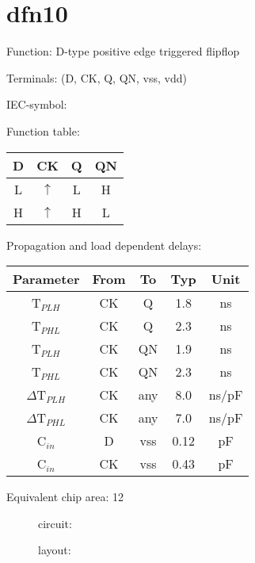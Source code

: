 \section{dfn10}

Function: D-type positive edge triggered flipflop

Terminals: (D, CK, Q, QN, vss, vdd)


IEC-symbol:
\begin{figure}[h]
\end{figure}

Function table:
\begin{table}[h]
\begin{tabular}{|c|c||c|c|}
\hline
D	&CK	&Q	&QN\\
\hline
L	&$\uparrow$	&L	&H\\
H	&$\uparrow$	&H	&L\\
\hline
\end{tabular}
\vspace{1cm}

Propagation and load dependent delays:\\

\begin{tabular}{|c|c|c|c|c|}
\hline
Parameter               &From            &To   &Typ    &Unit\\
\hline
T$_{PLH}$               &CK     	&Q      &1.8    &ns\\
T$_{PHL}$               &CK    		&Q      &2.3    &ns\\
T$_{PLH}$               &CK     	&QN     &1.9    &ns\\
T$_{PHL}$               &CK    		&QN     &2.3    &ns\\
\hline
$\Delta$T$_{PLH}$       &CK          	&any    &8.0    &ns/pF\\
$\Delta$T$_{PHL}$       &CK           	&any    &7.0    &ns/pF\\
\hline
C$_{in}$                &D	    	&vss    &0.12   &pF\\
C$_{in}$                &CK	    	&vss    &0.43   &pF\\
\hline
\end{tabular}
\end{table}

Equivalent chip area: 12

\begin{figure}[bht]
circuit:\\

\end{figure}

\begin{figure}[bth]
layout:\\

\end{figure}

\clearpage
